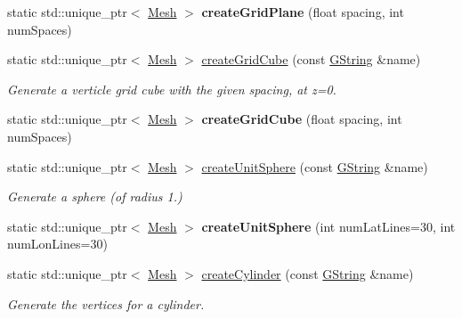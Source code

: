 \begin{Indent}
\begin{DoxyCompactItemize}
static std\+::unique\+\_\+ptr$<$ \mbox{\hyperlink{classrev_1_1_mesh}{Mesh}} $>$ {\bfseries create\+Grid\+Plane} (float spacing, int num\+Spaces)
\item 
\mbox{\label{classrev_1_1_polygon_cache_a25deb4bc3a6bf3c45f02a7df65b82fd8}} 
static std\+::unique\+\_\+ptr$<$ \mbox{\hyperlink{classrev_1_1_mesh}{Mesh}} $>$ \mbox{\hyperlink{classrev_1_1_polygon_cache_a25deb4bc3a6bf3c45f02a7df65b82fd8}{create\+Grid\+Cube}} (const \mbox{\hyperlink{classrev_1_1_g_string}{G\+String}} \&name)
\begin{DoxyCompactList}\small\item\em Generate a verticle grid cube with the given spacing, at z=0. \end{DoxyCompactList}\item 
\mbox{\label{classrev_1_1_polygon_cache_a641c532711d27b9b3e9f591a9dac5a5e}} 
static std\+::unique\+\_\+ptr$<$ \mbox{\hyperlink{classrev_1_1_mesh}{Mesh}} $>$ {\bfseries create\+Grid\+Cube} (float spacing, int num\+Spaces)
\item 
static std\+::unique\+\_\+ptr$<$ \mbox{\hyperlink{classrev_1_1_mesh}{Mesh}} $>$ \mbox{\hyperlink{classrev_1_1_polygon_cache_a3fe01a9dbddcbca577c7c4eecb378e7c}{create\+Unit\+Sphere}} (const \mbox{\hyperlink{classrev_1_1_g_string}{G\+String}} \&name)
\begin{DoxyCompactList}\small\item\em Generate a sphere (of radius 1.) \end{DoxyCompactList}\item 
\mbox{\label{classrev_1_1_polygon_cache_a1e419c0550d408dc5f7c5de1d274d7c4}} 
static std\+::unique\+\_\+ptr$<$ \mbox{\hyperlink{classrev_1_1_mesh}{Mesh}} $>$ {\bfseries create\+Unit\+Sphere} (int num\+Lat\+Lines=30, int num\+Lon\+Lines=30)
\item 
\mbox{\label{classrev_1_1_polygon_cache_a1716128c7859df644a08f01d8774e14d}} 
static std\+::unique\+\_\+ptr$<$ \mbox{\hyperlink{classrev_1_1_mesh}{Mesh}} $>$ \mbox{\hyperlink{classrev_1_1_polygon_cache_a1716128c7859df644a08f01d8774e14d}{create\+Cylinder}} (const \mbox{\hyperlink{classrev_1_1_g_string}{G\+String}} \&name)
\begin{DoxyCompactList}\small\item\em Generate the vertices for a cylinder. \end{DoxyCompactList}\item 

\end{DoxyCompactItemize}
\end{Indent}
